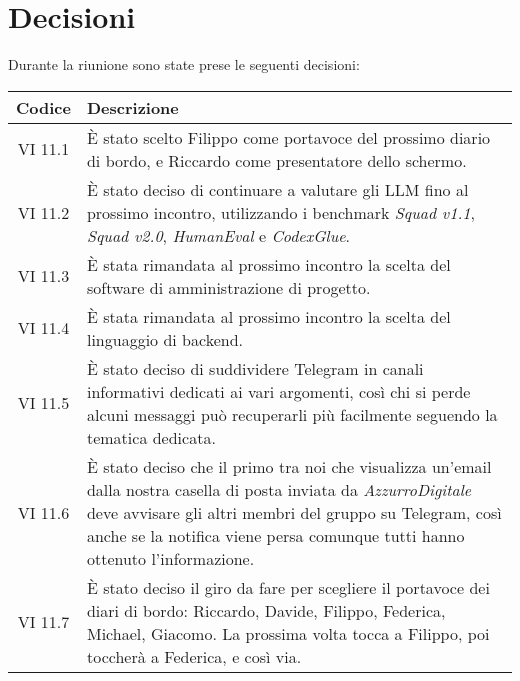 
\section{Decisioni}

Durante la riunione sono state prese le seguenti decisioni:

\vspace{0.5cm}

\begin{table}[htbp]
    \centering
    \begin{tabular}{|c|p{}|}
        \hline
        \rowcolor[gray]{0.75}
        \textbf{Codice} & \textbf{Descrizione}\\
        \hline
        VI 11.1 & È stato scelto Filippo come portavoce del prossimo diario di bordo, e Riccardo come presentatore dello schermo.\\
        \hline
        VI 11.2 & È stato deciso di continuare a valutare gli LLM fino al prossimo incontro, utilizzando i benchmark \emph{Squad v1.1}, \emph{Squad v2.0}, 
        \emph{HumanEval} e \emph{CodexGlue}.\\
        \hline
        VI 11.3 & È stata rimandata al prossimo incontro la scelta del software di amministrazione di progetto.\\
        \hline
        VI 11.4 & È stata rimandata al prossimo incontro la scelta del linguaggio di backend.\\
        \hline
        VI 11.5 & È stato deciso di suddividere Telegram in canali informativi dedicati ai vari argomenti, così chi si perde alcuni messaggi può 
        recuperarli più facilmente seguendo la tematica dedicata.\\
        \hline
        VI 11.6 & È stato deciso che il primo tra noi che visualizza un'email dalla nostra casella di posta inviata da \emph{AzzurroDigitale} deve avvisare
        gli altri membri del gruppo su Telegram, così anche se la notifica viene persa comunque tutti hanno ottenuto l'informazione.\\
        \hline
        VI 11.7 & È stato deciso il giro da fare per scegliere il portavoce dei diari di bordo: Riccardo, Davide, Filippo, Federica, Michael, Giacomo.
        La prossima volta tocca a Filippo, poi toccherà a Federica, e così via.\\
        \hline
    \end{tabular}
\end{table}